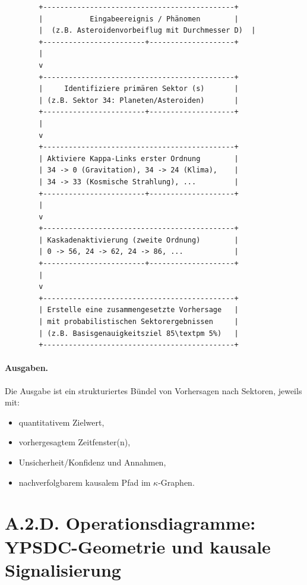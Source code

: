 \documentclass[13pt,a4paper]{article}
\begin{document}
	\begin{lstlisting}
		+---------------------------------------------+
		|           Eingabeereignis / Phänomen        |
		|  (z.B. Asteroidenvorbeiflug mit Durchmesser D)  |
		+------------------------+--------------------+
		|
		v
		+---------------------------------------------+
		|     Identifiziere primären Sektor (s)       |
		| (z.B. Sektor 34: Planeten/Asteroiden)       |
		+------------------------+--------------------+
		|
		v
		+---------------------------------------------+
		| Aktiviere Kappa-Links erster Ordnung        |
		| 34 -> 0 (Gravitation), 34 -> 24 (Klima),    |
		| 34 -> 33 (Kosmische Strahlung), ...         |
		+------------------------+--------------------+
		|
		v
		+---------------------------------------------+
		| Kaskadenaktivierung (zweite Ordnung)        |
		| 0 -> 56, 24 -> 62, 24 -> 86, ...            |
		+------------------------+--------------------+
		|
		v
		+---------------------------------------------+
		| Erstelle eine zusammengesetzte Vorhersage   |
		| mit probabilistischen Sektorergebnissen     |
		| (z.B. Basisgenauigkeitsziel 85\textpm 5%)   |
		+---------------------------------------------+
	\end{lstlisting}
	
	\paragraph{Ausgaben.}
	Die Ausgabe ist ein strukturiertes Bündel von Vorhersagen nach Sektoren, jeweils mit:
	\begin{itemize}[leftmargin=*]
		\item quantitativem Zielwert,
		\item vorhergesagtem Zeitfenster(n),
		\item Unsicherheit/Konfidenz und Annahmen,
		\item nachverfolgbarem kausalem Pfad im $\kappa$-Graphen.
	\end{itemize}
	
	\section*{A.2.D. Operationsdiagramme: YPSDC-Geometrie und kausale Signalisierung}
	
\end{document}
